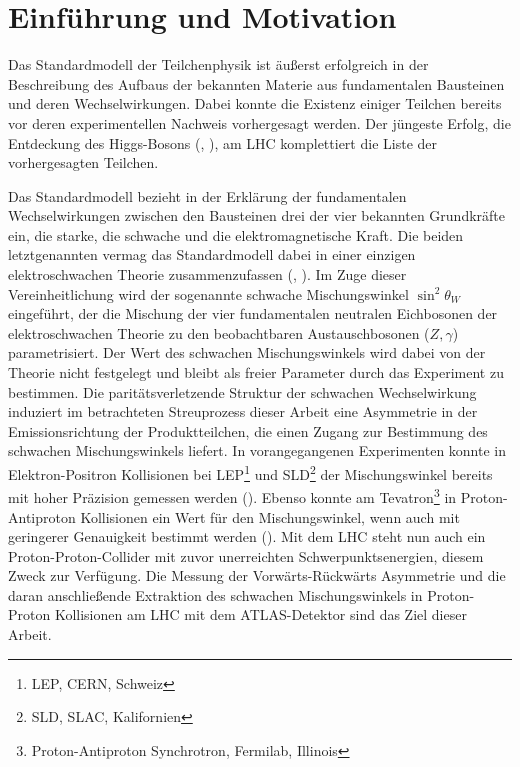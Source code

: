 


\chapter{Einführung und Motivation}


Das Standardmodell der Teilchenphysik ist äußerst erfolgreich in der
Beschreibung des Aufbaus der bekannten Materie aus fundamentalen Bausteinen und
deren Wechselwirkungen. Dabei konnte die Existenz einiger Teilchen bereits vor
deren experimentellen Nachweis vorhergesagt werden. Der jüngeste Erfolg, die
Entdeckung des Higgs-Bosons (\cite{Aad:2012tfa}, \cite{Chatrchyan:2013lba}), am
\ac{LHC} komplettiert die Liste der vorhergesagten Teilchen.

Das Standardmodell bezieht in der Erklärung der fundamentalen Wechselwirkungen
zwischen den Bausteinen drei der vier bekannten Grundkräfte ein, die starke,
die schwache und die elektromagnetische Kraft. Die beiden letztgenannten vermag
das Standardmodell dabei in einer einzigen elektroschwachen Theorie
zusammenzufassen (\cite{Glashow:1961tr}, \cite{Weinberg:1967tq}). Im Zuge
dieser Vereinheitlichung wird der sogenannte schwache Mischungswinkel
$\sin^2\theta_W$ eingeführt, der die Mischung der vier fundamentalen neutralen
Eichbosonen der elektroschwachen Theorie zu den beobachtbaren Austauschbosonen
($Z,\gamma$) parametrisiert. Der Wert des schwachen Mischungswinkels wird dabei
von der Theorie nicht festgelegt und bleibt als freier Parameter durch das
Experiment zu bestimmen. Die paritätsverletzende Struktur der schwachen
Wechselwirkung induziert im betrachteten Streuprozess dieser Arbeit eine
Asymmetrie in der Emissionsrichtung der Produktteilchen, die einen Zugang zur
Bestimmung des schwachen Mischungswinkels liefert. In vorangegangenen
Experimenten konnte in Elektron-Positron Kollisionen bei
\acs{LEP}\footnote{\acf{LEP}, \acs{CERN}, Schweiz} und
\acs{SLD}\footnote{\acf{SLD}, \acs{SLAC}, Kalifornien} der Mischungswinkel
bereits mit hoher Präzision gemessen werden (\cite{PhysRevD.86.010001}). Ebenso
konnte am Tevatron\footnote{Proton-Antiproton Synchrotron, Fermilab, Illinois}
in Proton-Antiproton Kollisionen ein Wert für den Mischungswinkel, wenn auch
mit geringerer Genauigkeit bestimmt werden (\cite{Abazov:2011ws}). Mit dem
\ac{LHC} steht nun auch ein Proton-Proton-Collider mit zuvor unerreichten
Schwerpunktsenergien, diesem Zweck zur Verfügung. Die Messung der
Vorwärts-Rückwärts Asymmetrie und die daran anschließende Extraktion des
schwachen Mischungswinkels in Proton-Proton Kollisionen am \ac{LHC} mit dem
ATLAS-Detektor sind das Ziel dieser Arbeit.

